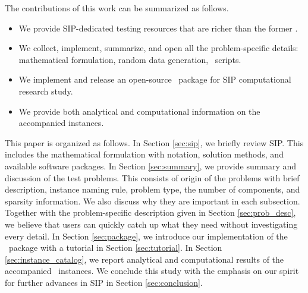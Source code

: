 The contributions of this work can be summarized as follows.
\begin{itemize}
	\item We provide SIP-dedicated testing resources that are richer than the former \siplib.
	\item We collect, implement, summarize, and open all the problem-specific details: 
	mathematical formulation, random data generation, \julia\ scripts.
	\item We implement and release an open-source \julia\ package for SIP computational research study.
	\item We provide both analytical and computational information on the accompanied 
	instances.
\end{itemize}


This paper is organized as follows. In Section \ref{sec:sip}, we briefly review SIP. This 
includes the mathematical formulation with notation, solution methods, and available software 
packages. In Section \ref{sec:summary}, we provide summary and discussion of the test 
problems. This consists of origin of the problems with brief description, instance naming 
rule, problem type, the number of components, and sparsity information. We also discuss why 
they are important in each subsection. Together with the problem-specific description given 
in Section \ref{sec:prob_desc}, we believe that users can quickly catch up what they need 
without investigating every detail. In Section \ref{sec:package}, we introduce our 
implementation of the \julia\ package with a tutorial in Section 
\ref{sec:tutorial}. In Section \ref{sec:instance_catalog}, we report analytical and 
computational results of the accompanied \smps\ instances. We conclude this study with the 
emphasis on our spirit for further advances in SIP in Section \ref{sec:conclusion}. 







